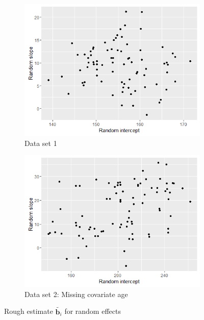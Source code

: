 \begin{figure}[!htb]
\centering
	\begin{subfigure}[b]{0.4\textwidth}
		\includegraphics[width=\textwidth]{mainmatter/chapter_5_simulation_study/ds_simple_randplot.png}
       \caption{\label{fig : ds_simple_randplot}Data set 1}
	\end{subfigure}    
	\begin{subfigure}[b]{0.4\textwidth}
		\includegraphics[width=\textwidth]{mainmatter/chapter_5_simulation_study/missing_continuous_covariate_randplot.png}
       \caption{\label{fig : missing_continuous_covariate_randplot} Data set 2: Missing covariate age}
	\end{subfigure}     
\caption{\label{fig : ds_simple_n_3wellsep}Rough estimate $\tilde{\boldsymbol{b}_i}$ for random effects}
\end{figure}


